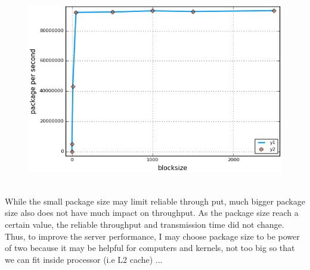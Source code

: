 \documentclass[12pt]{article}
\newenvironment{problem}[2][Problem]{\begin{trivlist}
\item[\hskip \labelsep {\bfseries #1}\hskip \labelsep {\bfseries #2.}]}{\end{trivlist}}
\begin{document}
\begin{problem}{1}
\begin{figure}
\includegraphics[scale = .6]{2.png} 
\end{figure}
\\
While the small package size may limit reliable through put, much bigger package size also does not have much impact on throughput. As the package size reach a certain value, the reliable throughput and transmission time did not change. Thus, to improve the server performance, I may choose package size to be power of two because it may be helpful for computers and kernels, not too big so that we can fit inside processor (i.e L2 cache) ... 
\end{problem}
\end{document}
